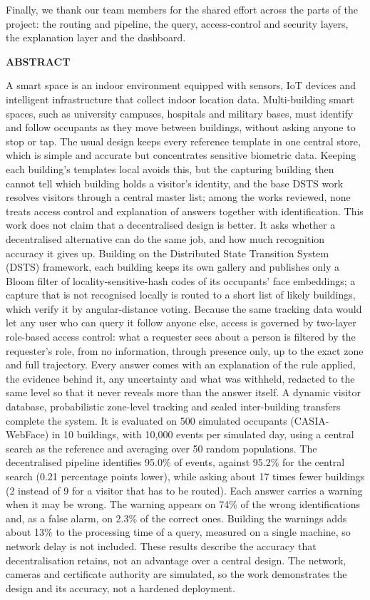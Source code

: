 \documentclass[12pt,a4paper,oneside]{report}
\begin{document}
Finally, we thank our team members for the shared effort across the parts of the project: the routing and pipeline, the query, access-control and security layers, the explanation layer and the dashboard.

\clearpage
{}
{}
{\centering \Large\bfseries ABSTRACT\par}
A smart space is an indoor environment equipped with sensors, IoT devices and intelligent infrastructure that collect indoor location data. Multi-building smart spaces, such as university campuses, hospitals and military bases, must identify and follow occupants as they move between buildings, without asking anyone to stop or tap. The usual design keeps every reference template in one central store, which is simple and accurate but concentrates sensitive biometric data. Keeping each building's templates local avoids this, but the capturing building then cannot tell which building holds a visitor's identity, and the base DSTS work resolves visitors through a central master list; among the works reviewed, none treats access control and explanation of answers together with identification. This work does not claim that a decentralised design is better. It asks whether a decentralised alternative can do the same job, and how much recognition accuracy it gives up. Building on the Distributed State Transition System (DSTS) framework, each building keeps its own gallery and publishes only a Bloom filter of locality-sensitive-hash codes of its occupants' face embeddings; a capture that is not recognised locally is routed to a short list of likely buildings, which verify it by angular-distance voting. Because the same tracking data would let any user who can query it follow anyone else, access is governed by two-layer role-based access control: what a requester sees about a person is filtered by the requester's role, from no information, through presence only, up to the exact zone and full trajectory. Every answer comes with an explanation of the rule applied, the evidence behind it, any uncertainty and what was withheld, redacted to the same level so that it never reveals more than the answer itself. A dynamic visitor database, probabilistic zone-level tracking and sealed inter-building transfers complete the system. It is evaluated on 500 simulated occupants (CASIA-WebFace) in 10 buildings, with 10,000 events per simulated day, using a central search as the reference and averaging over 50 random populations. The decentralised pipeline identifies 95.0\% of events, against 95.2\% for the central search (0.21 percentage points lower), while asking about 17 times fewer buildings (2 instead of 9 for a visitor that has to be routed). Each answer carries a warning when it may be wrong. The warning appears on 74\% of the wrong identifications and, as a false alarm, on 2.3\% of the correct ones. Building the warnings adds about 13\% to the processing time of a query, measured on a single machine, so network delay is not included. These results describe the accuracy that decentralisation retains, not an advantage over a central design. The network, cameras and certificate authority are simulated, so the work demonstrates the design and its accuracy, not a hardened deployment.
\end{document}
